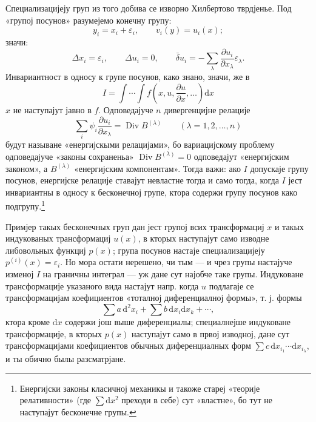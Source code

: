 ﻿\documentclass[11pt]{article}
\providecommand{\eps}{\varepsilon}
\providecommand{\D}{\Delta}
\providecommand{\p}{\partial}
\providecommand{\dd}{\mathrm d}
\DeclareMathOperator{\Div}{Div}
\providecommand{\bd}{\bar{\delta}}
\begin{document}
Специализацијеју груп из того добива се изворно Хилбертово тврдјенье. Под «групој посунов» разумејемо конечну групу:
\[
y_i=x_i+\eps_i,\qquad v_i(y)=u_i(x);
\]
значи:
\[
\D x_i=\eps_i,\qquad \D u_i=0,\qquad
\bd u_i=-\sum_\lambda\frac{\p u_i}{\p x_\lambda}\eps_\lambda.
\]
Инвариантност в односу к групе посунов, како знано, значи, же в
\[
I=\int\!\cdots\!\int f\!\left(x,u,\frac{\p u}{\p x},\ldots\right)\dd x
\]
\(x\) не наступајут јавно в \(f\). Одповедајуче \(n\) дивергенцијне релације
\[
\sum_i\psi_i\frac{\p u_i}{\p x_\lambda}=\Div B^{(\lambda)}
\qquad(\lambda=1,2,\ldots,n)
\]
будут называне «енергијскыми релацијами», бо вариацијскому проблему одповедајуче «законы сохраненьа» \(\Div B^{(\lambda)}=0\) одповедајут «енергијским законом», а \(B^{(\lambda)}\) «енергијским компонентам». Тогда важи: ако \(I\) допускаје групу посунов, енергијске релације ставајут невластне тогда и само тогда, когда \(I\) јест инвариантны в односу к бесконечној групе, ктора содержи групу посунов како подгрупу.\footnote{Енергијски законы класичној механикы и такоже стареј «теорије релативности» (где \(\sum \dd x^2\) преходи в себе) сут «властне», бо тут не наступајут бесконечне групы.}

Примјер такых бесконечных груп дан јест групој всих трансформациј \(x\) и такых индукованых трансформациј \(u(x)\), в кторых наступајут само изводне либовольных функциј \(p(x)\); група посунов настаје специализацијеју \(p^{(i)}(x)=\eps_i\). Но мора остати нерешено, чи тым --- и чрез групы настајуче изменој \(I\) на граничны интеграл --- уж дане сут најобче таке групы. Индуковане трансформације указаного вида настајут напр. когда \(u\) подлагаје се трансформацијам коефициентов «тоталној диференциалној формы», т. ј. формы
\[
\sum a\,\dd^2x_i+\sum b\,\dd x_i\dd x_k+\cdots,
\]
ктора кроме \(\dd x\) содержи још выше диференциалы; специалнејше индуковане трансформације, в кторых \(p(x)\) наступајут само в првој изводној, дане сут трансформацијами коефициентов обычных диференциалных форм \(\sum c\,\dd x_{i_1}\cdots \dd x_{i_\lambda}\), и ты обично былы разсматрјане.
\end{document}
